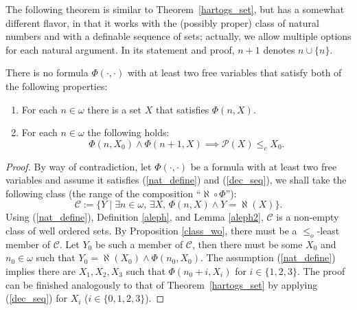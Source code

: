 The following theorem is similar to Theorem~\ref{hartogs_set}, but has a
somewhat different flavor, in that it works with the (possibly proper) class of
natural numbers and with a definable sequence of sets; actually, we allow
multiple options for each natural argument. In its statement and
proof,  $n+1$ denotes $n \cup \{n\}$.
\begin{theorem}[$\estf$]
	\label{hartogs_class}
	There is no formula $\Phi(\cdot,\cdot)$  with at least two free
        variables that satisfy both of the following properties:
	\begin{enumerate}
		\item \label{nat_define} For each $n\in\omega$ there is a set $X$ that satisfies $\Phi(n,X)$.
		\item \label{dec_seq} For each $n\in\omega$ the following holds: 
		\[
			\Phi(n,X_0) \land \Phi(n+1,X) \implies \mathcal{P}(X) \leq_c X_0.
		\] 
	\end{enumerate}
\end{theorem}

\begin{proof}
	By way of contradiction, let $\Phi(\cdot,\cdot)$ be a formula with at
        least two free variables and assume it satisfies (\ref{nat_define}) and
        (\ref{dec_seq}), we shall take the following class (the range of the
        composition “$\aleph\circ \Phi$”):
	\[
		 \mathcal{C} := \{Y \mid  \exists n\in\omega,\, \exists X,\, \Phi(n,X) \land Y = \aleph(X)\}.
	\]
	Using (\ref{nat_define}), Definition \ref{aleph}, and Lemma \ref{aleph2}, $\mathcal{C}$ is a non-empty class of well ordered sets. By Proposition \ref{class_wo}, there must be a $\leq_o$-least member of $\mathcal{C}$.
	Let $Y_0$ be such a member of $\mathcal{C}$, then there must be some $X_0$ and $n_0 \in\omega$ such that $Y_0 = \aleph(X_0) \land \Phi(n_0,X_0)$.
	The assumption (\ref{nat_define}) implies there are $X_1 , X_2, X_3$ such that $\Phi(n_0 + i , X_i)$ for $i\in\{1,2,3\}$.
	The proof can be finished analogously to that of
        Theorem~\ref{hartogs_set} by applying (\ref{dec_seq}) for $X_i$ ($i\in\{0,1,2,3\}$).
\end{proof}


